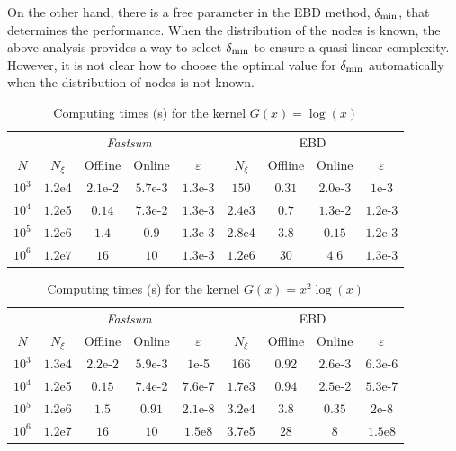 \documentclass[smallextended]{svjour3}
\begin{document}
On the other hand, there is a free parameter in the EBD method, $\delta_{\min}$, that determines the performance. When the distribution of the nodes is known, the above analysis provides a way to select $\delta_{\min}$ to ensure a quasi-linear complexity. However, it is not clear how to choose the optimal value for $\delta_{\min}$ automatically when the distribution of nodes is not known. 
	
 \begin{table}[t]
 	\centering
 	\caption{Computing times (s) for the kernel $G(x) = \log(x)$}
 	\begin{tabular}{*9c}
 		\toprule
	 	&  \multicolumn{4}{c}{\textit{Fastsum}} & \multicolumn{4}{c}{EBD}\\
 		\cmidrule(lr){2-5}\cmidrule(lr){6-9}
 		$N$   & $N_\xi$ & Offline   & Online    & $\varepsilon$ & $N_\xi$ & Offline   & Online  & $\varepsilon$ \\
 		$10^3$   & $1.2$e4 & $2.1$e-2   & $5.7$e-3    & $1.3$e-3 & $150$ & $0.31$   & $2.0$e-3  & $1$e-3 \\
 		$10^4$   & $1.2$e5 & $0.14$   & $7.3$e-2    & $1.3$e-3 & $2.4$e3 & $0.7$  & $1.3$e-2 & $1.2$e-3 \\
 		$10^5$   & $1.2$e6 & $1.4$ & $0.9$    & $1.3$e-3 & $2.8$e4 & $3.8$   & $0.15$  & $1.2$e-3 \\
 		$10^6$   & $1.2$e7 & $16$   &  $10$    & $1.3$e-3 & $1.2$e6 & $30$ & $4.6$  & $1.3$e-3 \\
 		\bottomrule
 	\end{tabular}
 \end{table}
 \vspace{-0.5cm}
  \begin{table}[t]
  	\centering
  	\caption{Computing times (s) for the kernel $G(x) = x^2\log(x)$}
  	\begin{tabular}{*9c}
  		\toprule
  		&  \multicolumn{4}{c}{\textit{Fastsum}} & \multicolumn{4}{c}{EBD}\\
  		\cmidrule(lr){2-5}\cmidrule(lr){6-9}
  		$N$   & $N_\xi$ & Offline   & Online    & $\varepsilon$ & $N_\xi$ & Offline   & Online  & $\varepsilon$ \\
  		$10^3$   & $1.3$e4 & $2.2$e-$2$   & $5.9$e-$3$    & $1$e-5 & 166 & 0.92   & $2.6$e-$3$   & $6.3$e-6 \\
  		$10^4$   & $1.2$e5 & $0.15$  & $7.4$e-2    & $7.6$e-7 & $1.7$e3 & $0.94$   & $2.5$e-2  & $5.3$e-7 \\
  		$10^5$   & $1.2$e6 & $1.5$   & $0.91$    & $2.1$e-8 & $3.2$e4 & $3.8$   & $0.35$  & $2$e-8 \\
  		$10^6$   & $1.2$e7 & $16$   & $10$    & $1.5$e8 & $3.7$e5 & $28$   & $8$  & $1.5$e8 \\
  		
  		\bottomrule
  	\end{tabular}
  \end{table}
  
\end{document}
